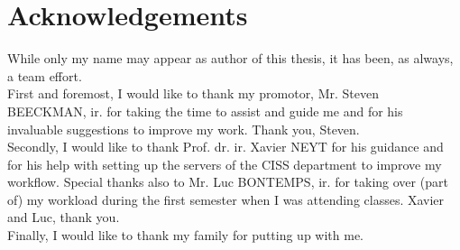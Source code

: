 \chapter*{Acknowledgements}
While only my name may appear as author of this thesis, it has been, as always, a team effort.\\
First and foremost, I would like to thank my promotor, Mr. Steven BEECKMAN, ir. for taking the time to assist and guide me and for his invaluable suggestions to improve my work. Thank you, Steven.\\
Secondly, I would like to thank Prof. dr. ir.  Xavier NEYT for his guidance and for his help with setting up the servers of the CISS department to improve my workflow. Special thanks also to Mr. Luc BONTEMPS, ir. for taking over (part of) my workload during the first semester when I was attending classes. Xavier and Luc, thank you.\\
Finally, I would like to thank my family for putting up with me.

